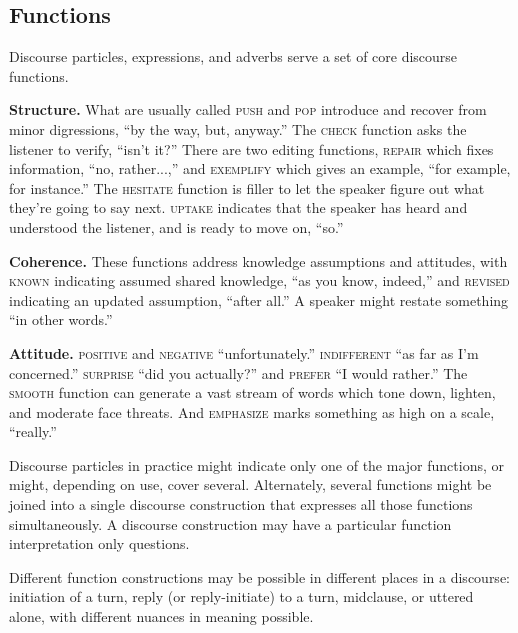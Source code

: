 \documentclass[11pt]{article}
\newcommand{\I}[1]{\textsc{#1}}   %
\begin{document}
{\subsection{Functions} Discourse particles, expressions, and adverbs
serve a set of core discourse functions.

\textbf{Structure.} What are usually called \I{push} and \I{pop}
introduce and recover from minor digressions, ``by the way, but,
anyway.''  The \I{check} function asks the listener to verify, ``isn't
it?''  There are two editing functions, \I{repair} which fixes
information, ``no, rather...,'' and \I{exemplify} which gives an
example, ``for example, for instance.''  The \I{hesitate} function is
filler to let the speaker figure out what they're going to say next.
\I{uptake} indicates that the speaker has heard and understood the
listener, and is ready to move on, ``so.''

\textbf{Coherence.} These functions address knowledge assumptions and
attitudes, with \I{known} indicating assumed shared knowledge, ``as
you know, indeed,'' and \I{revised} indicating an updated assumption,
``after all.''  A speaker might restate something ``in other words.''

\textbf{Attitude.} \I{positive} and \I{negative} ``unfortunately.''
\I{indifferent} ``as far as I'm concerned.''  \I{surprise} ``did you
actually?'' and \I{prefer} ``I would rather.''  The \I{smooth}
function can generate a vast stream of words which tone down, lighten,
and moderate face threats.  And \I{emphasize} marks something as high
on a scale, ``really.''

Discourse particles in practice might indicate only one of the major
functions, or might, depending on use, cover several.  Alternately,
several functions might be joined into a single discourse construction
that expresses all those functions simultaneously.  A discourse
construction may have a particular function interpretation only
questions.

Different function constructions may be possible in different places
in a discourse: initiation of a turn, reply (or reply-initiate) to a
turn, midclause, or uttered alone, with different nuances in meaning
possible. 

}
\end{document}
